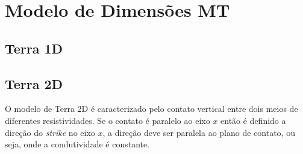         
        
    
    
    
    \section{Modelo de Dimensões MT}
        \subsection{Terra 1D}
        \subsection{Terra 2D}
        
        O modelo de Terra 2D é caracterizado pelo contato vertical entre dois meios de diferentes resistividades. Se o contato é
	    paralelo ao eixo $x$ então é definido a direção do \textit{strike} no eixo $x$, a direção deve ser paralela ao plano de contato,
	    ou seja, onde a condutividade é constante.%
	    

